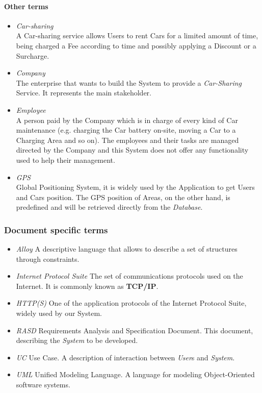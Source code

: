 \paragraph{Other terms}
	\begin{itemize}
		\item \emph{Car-sharing} \\
		A Car-sharing service allows Users to rent Cars for a limited amount of time, being charged a Fee according to time and possibly applying a Discount or a Surcharge.	
	
		\item \emph{Company} \\
		The enterprise that wants to build the System to provide a \textit{Car-Sharing} Service. It represents the main stakeholder.		
		
		\item \emph{Employee}\\
		A person paid by the Company which is in charge of every kind of Car maintenance (e.g. charging the Car battery on-site, moving a Car to a Charging Area and so on). The employees and their tasks are managed directed by the Company and this System does not offer any functionality used to help their management.
	
		\item \emph{GPS}\\
		Global Positioning System, it is widely used by the Application to get Users and Cars position. The GPS position of Areas, on the other hand, is predefined and will be retrieved directly from the \emph{Database}.
\end{itemize}

\subsubsection{Document specific terms}
\begin{itemize}
	\item \emph{Alloy} 
	A descriptive language that allows to describe a set of structures through constraints.
	
	\item \emph{Internet Protocol Suite}
	The set of communications protocols used on the Internet. It is commonly known as \textbf{TCP/IP}.
	
	\item \emph{HTTP(S)}
	One of the application protocols of the Internet Protocol Suite, widely used by our System.
	
	\item \emph{RASD}
	Requirements Analysis and Specification Document. This document, describing the \emph{System} to be developed.
	
	\item \emph{UC}
	Use Case. A description of interaction between \emph{User}s and \emph{System}.
	
	\item \emph{UML}
	Unified Modeling Language. A language for modeling Object-Oriented software systems.
\end{itemize}